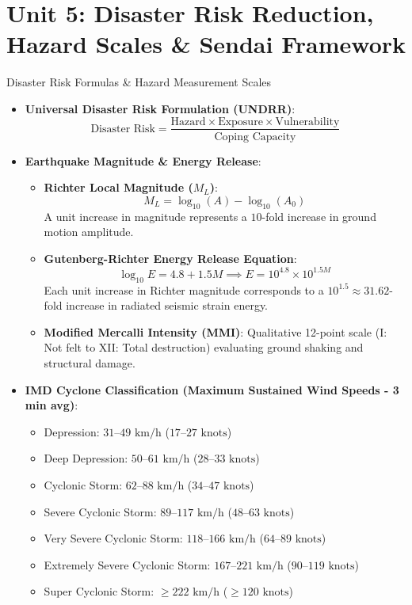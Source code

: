 \chapter{Unit 5: Disaster Risk Reduction, Hazard Scales \& Sendai Framework}

\begin{formulabox}{Disaster Risk Formulas \& Hazard Measurement Scales}
\begin{itemize}[leftmargin=1.2em]
    \item \textbf{Universal Disaster Risk Formulation (UNDRR)}:
    \begin{equation}
    \text{Disaster Risk} = \frac{\text{Hazard} \times \text{Exposure} \times \text{Vulnerability}}{\text{Coping Capacity}}
    \end{equation}
    \item \textbf{Earthquake Magnitude \& Energy Release}:
    \begin{itemize}
        \item \textbf{Richter Local Magnitude ($M_L$)}:
        \begin{equation}
        M_L = \log_{10}(A) - \log_{10}(A_0)
        \end{equation}
        A unit increase in magnitude represents a $10$-fold increase in ground motion amplitude.
        \item \textbf{Gutenberg-Richter Energy Release Equation}:
        \begin{equation}
        \log_{10} E = 4.8 + 1.5 M \implies E = 10^{4.8} \times 10^{1.5 M}
        \end{equation}
        Each unit increase in Richter magnitude corresponds to a $10^{1.5} \approx 31.62$-fold increase in radiated seismic strain energy.
        \item \textbf{Modified Mercalli Intensity (MMI)}: Qualitative 12-point scale (I: Not felt to XII: Total destruction) evaluating ground shaking and structural damage.
    \end{itemize}
    \item \textbf{IMD Cyclone Classification (Maximum Sustained Wind Speeds - 3 min avg)}:
    \begin{itemize}
        \item Depression: $31\text{--}49\text{ km/h}$ ($17\text{--}27\text{ knots}$)
        \item Deep Depression: $50\text{--}61\text{ km/h}$ ($28\text{--}33\text{ knots}$)
        \item Cyclonic Storm: $62\text{--}88\text{ km/h}$ ($34\text{--}47\text{ knots}$)
        \item Severe Cyclonic Storm: $89\text{--}117\text{ km/h}$ ($48\text{--}63\text{ knots}$)
        \item Very Severe Cyclonic Storm: $118\text{--}166\text{ km/h}$ ($64\text{--}89\text{ knots}$)
        \item Extremely Severe Cyclonic Storm: $167\text{--}221\text{ km/h}$ ($90\text{--}119\text{ knots}$)
        \item Super Cyclonic Storm: $\ge 222\text{ km/h}$ ($\ge 120\text{ knots}$)
    \end{itemize}
\end{itemize}
\end{formulabox}

